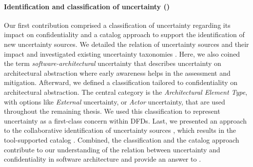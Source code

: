 \paragraph{Identification and classification of uncertainty ()}
Our first contribution comprised a classification of uncertainty regarding its impact on confidentiality \cite{hahner_classification_2023} and a catalog approach to support the identification of new uncertainty sources.
We detailed the relation of uncertainty sources and their impact and investigated existing uncertainty taxonomies \cite{walker_defining_2003,perez-palacin_uncertainties_2014,ramirez_taxonomy_2012,mahdavi-hezavehi_classification_2017,bures_capturing_2020}.
Here, we also coined the term \emph{software-architectural} uncertainty that describes uncertainty on architectural abstraction where early awareness helps in the assessment and mitigation.
Afterward, we defined a classification tailored to confidentiality on architectural abstraction.
The central category is the \emph{Architectural Element Type}, with options like \emph{External} uncertainty, or \emph{Actor} uncertainty, that are used throughout the remaining thesis.
We used this classification to represent uncertainty as a first-class concern \cite{garlan_software_2010} within \acfp{DFD}.
Last, we presented an approach to the collaborative identification of uncertainty sources \cite{hahner_arcn_2024}, which results in the tool-supported catalog \arcen.
Combined, the classification and the catalog approach contribute to our understanding of the relation between uncertainty and confidentiality in software architecture and provide an answer to .



